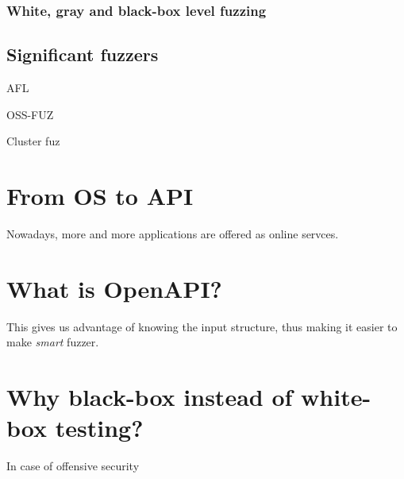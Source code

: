 \subsubsection{White, gray and black-box level fuzzing}
\label{ssub:White, gray and black-box level fuzzing}

\subsection{Significant fuzzers}
\label{ssub:Significant fuzzers}

AFL

OSS-FUZ

Cluster fuz

\section{From OS to API}
Nowadays, more and more applications are offered as online servces.

\section{What is OpenAPI?}
This gives us advantage of knowing the input structure, thus making it easier to make \emph{smart} fuzzer.

\section{Why black-box instead of white-box testing?}
In case of offensive security
